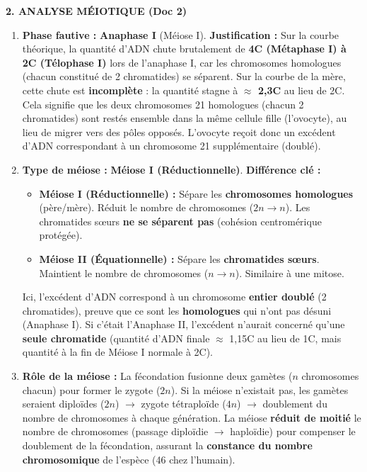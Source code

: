 \documentclass[11pt]{article}
\begin{document}
\begin{exoresolu}
\textbf{2. ANALYSE MÉIOTIQUE (Doc 2)}
\begin{enumerate}
\item \textbf{Phase fautive :} \textbf{Anaphase I} (Méiose I).
\textbf{Justification :} Sur la courbe théorique, la quantité d'ADN chute brutalement de \textbf{4C (Métaphase I) à 2C (Télophase I)} lors de l'anaphase I, car les chromosomes homologues (chacun constitué de 2 chromatides) se séparent. Sur la courbe de la mère, cette chute est \textbf{incomplète} : la quantité stagne à \textbf{$\approx$ 2,3C} au lieu de 2C. Cela signifie que les deux chromosomes 21 homologues (chacun 2 chromatides) sont restés ensemble dans la même cellule fille (l'ovocyte), au lieu de migrer vers des pôles opposés. L'ovocyte reçoit donc un excédent d'ADN correspondant à un chromosome 21 supplémentaire (doublé).
\item \textbf{Type de méiose :} \textbf{Méiose I (Réductionnelle)}.
\textbf{Différence clé :}
\begin{itemize}
\item \textbf{Méiose I (Réductionnelle) :} Sépare les \textbf{chromosomes homologues} (père/mère). Réduit le nombre de chromosomes ($2n \to n$). Les chromatides sœurs \textbf{ne se séparent pas} (cohésion centromérique protégée).
\item \textbf{Méiose II (Équationnelle) :} Sépare les \textbf{chromatides sœurs}. Maintient le nombre de chromosomes ($n \to n$). Similaire à une mitose.
\end{itemize}
Ici, l'excédent d'ADN correspond à un chromosome \textbf{entier doublé} (2 chromatides), preuve que ce sont les \textbf{homologues} qui n'ont pas désuni (Anaphase I). Si c'était l'Anaphase II, l'excédent n'aurait concerné qu'une \textbf{seule chromatide} (quantité d'ADN finale $\approx$ 1,15C au lieu de 1C, mais quantité à la fin de Méiose I normale à 2C).
\item \textbf{Rôle de la méiose :} La fécondation fusionne deux gamètes ($n$ chromosomes chacun) pour former le zygote ($2n$). Si la méiose n'existait pas, les gamètes seraient diploïdes ($2n$) $\to$ zygote tétraploïde ($4n$) $\to$ doublement du nombre de chromosomes à chaque génération. La méiose \textbf{réduit de moitié} le nombre de chromosomes (passage diploïdie $\to$ haploïdie) pour compenser le doublement de la fécondation, assurant la \textbf{constance du nombre chromosomique} de l'espèce (46 chez l'humain).
\end{enumerate}


\end{exoresolu}
\end{document}
